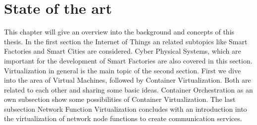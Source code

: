 \chapter{State of the art}
This chapter will give an overview into the background and concepts of this thesis.
In the first section the Internet of Things an related subtopics like Smart Factories and Smart Cities are considered.
Cyber Physical Systems, which are important for the development of Smart Factories are also covered in this section.
Virtualization in general is the main topic of the second section.
First we dive into the area of Virtual Machines, followed by Container Virtualization.
Both are related to each other and sharing some basic ideas.
Container Orchestration as an own subsection show some possibilities of Container Virtualization.
The last subsection Network Function Virtualization concludes with an introduction into the virtualization of network node functions to create communication services.


